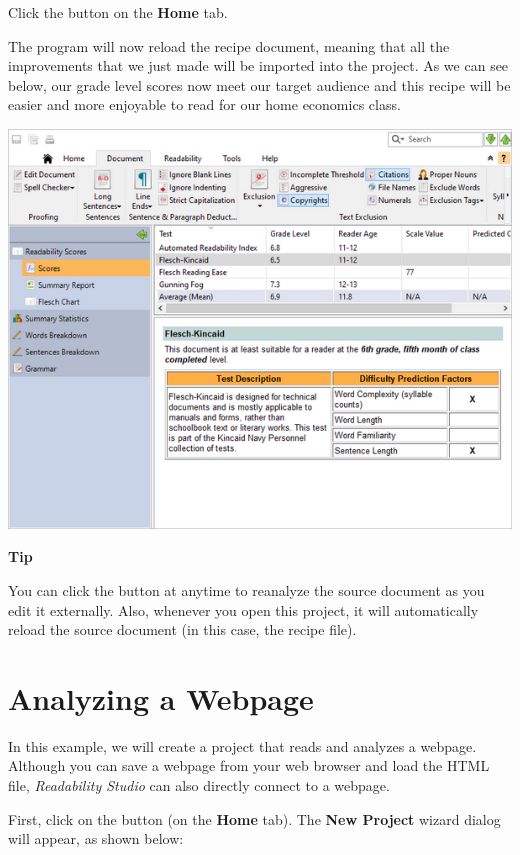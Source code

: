 \documentclass[
]{book}
\newenvironment{tipsection}
    {
    \begin{tcolorbox}[colframe=lightgray,colback=lightyellow,arc=3mm]
    \faLightbulb[regular] \textbf{Tip} \newline
    }
    {
    \end{tcolorbox}
    }
\theoremstyle{definition}
\theoremstyle{definition}
\theoremstyle{definition}
\theoremstyle{definition}
\theoremstyle{remark}
\begin{document}
Click the  button on the \textbf{Home} tab.

The program will now reload the recipe document, meaning that all the improvements that we just made will be imported into the project. As we can see below, our grade level scores now meet our target audience and this recipe will be easier and more enjoyable to read for our home economics class.

\includegraphics{Images/improvedscores.png}

\begin{tipsection}
You can click the  button at anytime to reanalyze the source document as you edit it externally. Also, whenever you open this project, it will automatically reload the source document (in this case, the recipe file).

\end{tipsection}

\newpage

\hypertarget{analyzing-a-webpage}{%
\section{Analyzing a Webpage}\label{analyzing-a-webpage}}

In this example, we will create a project that reads and analyzes a webpage. Although you can save a webpage from your web browser and load the HTML file, \emph{Readability Studio} can also directly connect to a webpage.

First, click on the  button (on the \textbf{Home} tab). The \textbf{New Project} wizard dialog will appear, as shown below:
\end{document}

